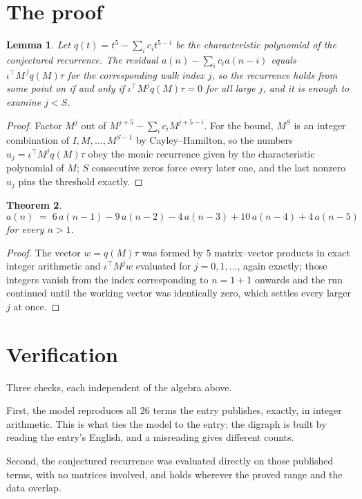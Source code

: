 \documentclass[11pt,a4paper]{article}
\theoremstyle{plain}
\newtheorem{theorem}{Theorem}
\newtheorem{lemma}[theorem]{Lemma}
\theoremstyle{definition}
\begin{document}
\section{The proof}

\begin{lemma}\label{lem:crit}
Let $q(t)=t^{5}-\sum_i c_it^{5-i}$ be the characteristic polynomial of the
conjectured recurrence. The residual $a(n)-\sum_ic_ia(n-i)$ equals
$\iota^{\!\top}M^{\,j}q(M)\tau$ for the corresponding walk index $j$, so the recurrence
holds from some point on if and only if $\iota^{\!\top}M^{j}q(M)\tau=0$ for all large $j$,
and it is enough to examine $j<S$.
\end{lemma}

\begin{proof}
Factor $M^{j}$ out of $M^{j+5}-\sum_ic_iM^{j+5-i}$. For the bound, $M^{S}$
is an integer combination of $I,M,\dots,M^{S-1}$ by Cayley--Hamilton, so the numbers
$u_j=\iota^{\!\top}M^{j}q(M)\tau$ obey the monic recurrence given by the characteristic
polynomial of $M$; $S$ consecutive zeros force every later one, and the last nonzero $u_j$
pins the threshold exactly.
\end{proof}

\begin{theorem}
\[
a(n)\;=\;6\,a(n-1) - 9\,a(n-2) - 4\,a(n-3) + 10\,a(n-4) + 4\,a(n-5)
\]
for every $n>1$.
\end{theorem}

\begin{proof}
The vector $w=q(M)\tau$ was formed by $5$ matrix--vector products in exact integer
arithmetic and $\iota^{\!\top}M^{j}w$ evaluated for $j=0,1,\dots$, again exactly; those
integers vanish from the index corresponding to $n=1+1$ onwards and the run continued
until the working vector was identically zero, which settles every larger $j$ at once.
\end{proof}

\section{Verification}

Three checks, each independent of the algebra above.

First, the model reproduces all $26$ terms the entry publishes, exactly, in integer
arithmetic. This is what ties the model to the entry: the digraph is built by reading the
entry's English, and a misreading gives different counts.

Second, the conjectured recurrence was evaluated directly on those published terms, with no
matrices involved, and holds wherever the proved range and the data overlap.
\end{document}
